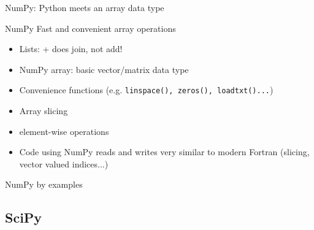\begin{frame}{NumPy: Python meets an array data type}

\begin{exbox}{NumPy}
Fast and convenient array operations
\end{exbox}

\begin{itemize}
    \item Lists: + does join, not add!
    \item NumPy array: basic vector/matrix data type
    \item Convenience functions (e.g. {\texttt{linspace(), zeros(), loadtxt()...}})
    \item Array slicing
    \item element-wise operations
    \item Code using NumPy reads and writes very similar to modern Fortran
    (slicing, vector valued indices...)
\end{itemize}

\end{frame}

\begin{frame}[fragile]{NumPy by examples}



\end{frame}

\subsection{SciPy}

